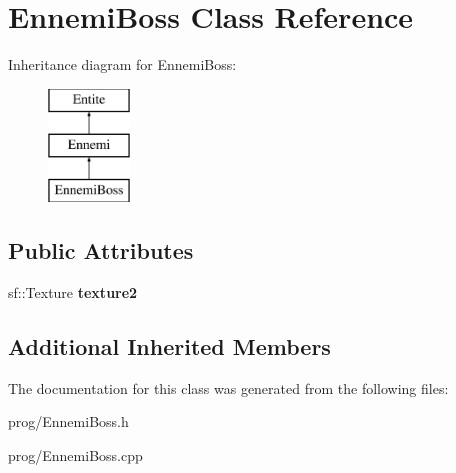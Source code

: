 \hypertarget{class_ennemi_boss}{}\section{Ennemi\+Boss Class Reference}
\label{class_ennemi_boss}
Inheritance diagram for Ennemi\+Boss\+:\begin{figure}[H]
\begin{center}
\leavevmode
\includegraphics[height=3.000000cm]{class_ennemi_boss}
\end{center}
\end{figure}
\subsection*{Public Attributes}
\begin{DoxyCompactItemize}
\item 
\mbox{\label{class_ennemi_boss_a98ffff45074e0f9a79ecf8d60e7b5af1}} 
sf\+::\+Texture {\bfseries texture2}
\end{DoxyCompactItemize}
\subsection*{Additional Inherited Members}


The documentation for this class was generated from the following files\+:\begin{DoxyCompactItemize}
\item 
prog/Ennemi\+Boss.\+h\item 
prog/Ennemi\+Boss.\+cpp\end{DoxyCompactItemize}
